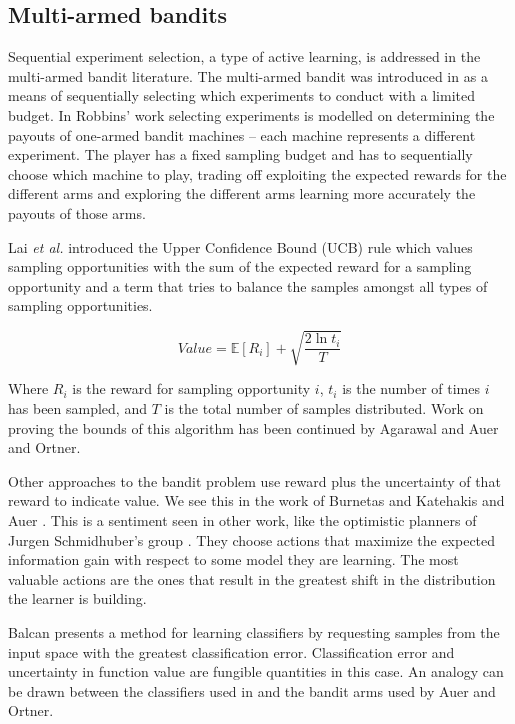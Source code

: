 \subsection{Multi-armed bandits}

Sequential experiment selection, a type of active learning, is addressed in the
multi-armed bandit literature.  The multi-armed bandit was introduced in
\cite{robbins1952some} as a means of sequentially selecting which experiments
to conduct with a limited budget.  In Robbins' work \cite{robbins1952some}
selecting experiments is modelled on determining the payouts of one-armed
bandit machines -- each machine represents a different experiment.  The player
has a fixed sampling budget and has to sequentially choose which machine to
play, trading off exploiting the expected rewards for the different arms and
exploring the different arms learning more accurately the payouts of those
arms.  

Lai \emph{et al.} \cite{lai1985asymptotically} introduced the Upper Confidence
Bound (UCB) rule which values sampling opportunities with the sum of the
expected reward for a sampling opportunity and a term that tries to balance the
samples amongst all types of sampling opportunities.

$$
Value = \mathbb{E}\left[R_i\right] + \sqrt{\frac{2\ln t_i}{T}}
$$

Where $R_i$ is the reward for sampling opportunity $i$, $t_i$ is the number of
times $i$ has been sampled, and $T$ is the total number of samples distributed.
Work on proving the bounds of this algorithm has been continued by Agarawal
\cite{agrawal1995sample} and Auer and Ortner\cite{auer2010ucb}.  


Other approaches to the bandit problem use reward plus the uncertainty of that
reward to indicate value.  We see this in the work of Burnetas and Katehakis
\cite{burnetas1997optimal} and Auer \cite{auer2003using}.  This is a sentiment
seen in other work, like the optimistic planners of Jurgen Schmidhuber's group
\cite{schmidhuber1997what,schmidhuber2003exploring,schmidhuber2009simple,sun2011planning}.
They choose actions that maximize the expected information gain with respect to
some model they are learning.  The most valuable actions are the ones that
result in the greatest shift in the distribution the learner is building.

Balcan \cite{balcan2006agnostic} presents a method for learning classifiers by
requesting samples from the input space with the greatest classification
error.  Classification error and uncertainty in function value
are fungible quantities in this case.  An analogy can be drawn between
the classifiers used in \cite{balcan2006agnostic} and the bandit arms used by
Auer and Ortner\cite{auer2010ucb}.

